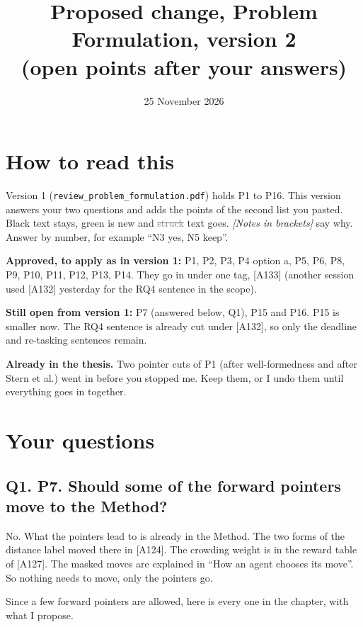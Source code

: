 \documentclass[11pt,a4paper]{article}
\title{Proposed change, Problem Formulation, version 2\\ (open points after your answers)}
\date{25 November 2026}
\newcommand{\new}[1]{\textcolor{newc}{#1}}
\newcommand{\old}[1]{\textcolor{gray}{\sout{#1}}}
\newcommand{\note}[1]{{\small\itshape [#1]}}
\newcommand{\pitem}[2]{\subsection*{#1. #2}}
\begin{document}
\sloppy
\maketitle

\section*{How to read this}
Version 1 (\texttt{review\_problem\_formulation.pdf}) holds P1 to P16. This
version answers your two questions and adds the points of the second list
you pasted. Black text stays, \new{green} is new and \old{struck} text goes.
\note{Notes in brackets} say why. Answer by number, for example ``N3 yes,
N5 keep''.

\textbf{Approved, to apply as in version 1:} P1, P2, P3, P4 option a, P5,
P6, P8, P9, P10, P11, P12, P13, P14. They go in under one tag, [A133]
(another session used [A132] yesterday for the RQ4 sentence in the scope).

\textbf{Still open from version 1:} P7 (answered below, Q1), P15 and P16.
P15 is smaller now. The RQ4 sentence is already cut under [A132], so only
the deadline and re-tasking sentences remain.

\textbf{Already in the thesis.} Two pointer cuts of P1 (after
well-formedness and after Stern et al.) went in before you stopped me. Keep
them, or I undo them until everything goes in together.

\section*{Your questions}

\pitem{Q1}{P7. Should some of the forward pointers move to the Method?}
No. What the pointers lead to is already in the Method. The two forms of
the distance label moved there in [A124]. The crowding weight is in the
reward table of [A127]. The masked moves are explained in ``How an agent
chooses its move''. So nothing needs to move, only the pointers go.

Since a few forward pointers are allowed, here is every one in the chapter,
with what I propose.
\end{document}
